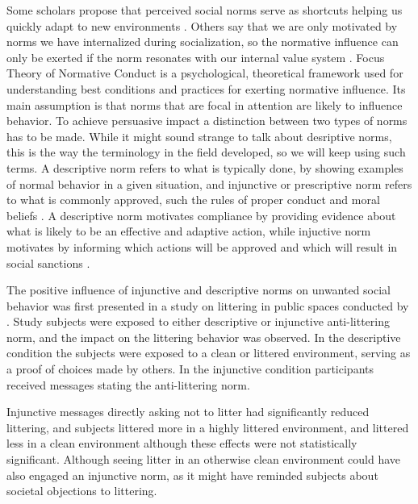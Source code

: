 \documentclass[preprint,12pt]{elsarticle}
\begin{document}
Some scholars propose that perceived social norms serve as shortcuts helping us quickly adapt to new environments \citep{cialdini1990focus}. Others say that we are only motivated by norms we have internalized during socialization, so the normative influence can only be exerted if the norm resonates with our internal value system \citep{morris2018common}.  Focus Theory of Normative Conduct \citep{kallgren2000focus} is a psychological, theoretical framework used for understanding best conditions and practices for exerting normative influence. Its main assumption is that norms that are focal in attention are likely to influence behavior.  %
To achieve persuasive impact a distinction between two types of norms has to be made. While it might sound strange to talk about desriptive norms, this is the way the terminology in the field developed, so we will keep using such terms.  A descriptive norm refers to what is typically done, by showing  examples of  normal behavior in a given situation, and injunctive or prescriptive norm refers to what is commonly approved, such the rules of proper conduct and moral beliefs \citep{cialdini1990focus}.  A descriptive norm motivates compliance by providing evidence about what is likely to be an effective and adaptive action, while injuctive norm motivates by informing which actions will be approved and which will result in social sanctions \citep{yanowitzky2006communication, cialdini2004social, kallgren2000focus}. 


The positive influence of injunctive and descriptive norms on unwanted social behavior was first presented in a study on littering in public spaces conducted by \citet{cialdini1990focus}. Study subjects were exposed to either descriptive or injunctive anti-littering norm, and the impact on the littering behavior was observed. In the descriptive condition the subjects were exposed to a clean or littered environment, serving as a proof of choices made by others. In the injunctive condition participants received messages stating the anti-littering norm.

Injunctive messages directly asking not to litter had significantly reduced littering, and subjects littered more in a highly littered environment, and littered less in a clean environment although these effects were not statistically significant. %
Although seeing litter in an otherwise clean environment could have also engaged an injunctive norm, as it might have reminded subjects about societal objections to littering.
\end{document}
